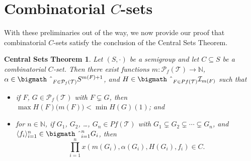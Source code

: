 \documentclass{article}
\theoremstyle{plain}
\newtheorem{cst}[thm]{Central Sets Theorem}
\theoremstyle{definition}
\newcommand{\la}{\langle}
\newcommand{\ra}{\rangle}
\newcommand{\bbN}{\mathbb{N}}
\newcommand{\calI}{\mathcal{I}}
\newcommand{\calT}{\mathcal{T}}
\newcommand{\Pf}{\mathcal{P}_f}
\newcommand{\bigtimes}{\hbox{\bigmath \char'2}}
\begin{document}
\section{Combinatorial $C$-sets}
With these preliminaries out of the way, we now provide our proof that
combinatorial $C$-sets satisfy the conclusion of the Central Sets
Theorem. 
\begin{cst}
  Let $(S, \cdot)$ be a semigroup and let $C \subseteq S$ be a
  combinatorial $C$-set.
  Then there exist functions $m \colon \Pf(\calT) \to \bbN$, $\alpha
  \in \bigtimes_{F \in \Pf(\calT)} S^{m(F) + 1}$, and $H \in
  \bigtimes_{F \in Pf(\calT)} \calI_{m(F)}$ such that 
  \begin{itemize}
    \item[(1)] if $F$, $G \in \Pf(\calT)$ with $F \subsetneq G$, then
      $\max H(F)\bigl(m(F)\bigr) < \min H(G)(1)$; and

    \item[(2)] for $n \in \bbN$, if $G_1$, $G_2$, \ldots, $G_n \in
      Pf(\calT)$ with $G_1 \subsetneq G_2 \subsetneq \cdots \subsetneq
      G_n$, and $\la f_i \ra_{i=1}^n \in \bigtimes_{i=1}^n G_i$, then 
      \[
        \prod_{i=1}^n x(m(G_i), \alpha(G_i), H(G_i), f_i) \in C.
      \]
  \end{itemize}
\end{cst}
\end{document}
